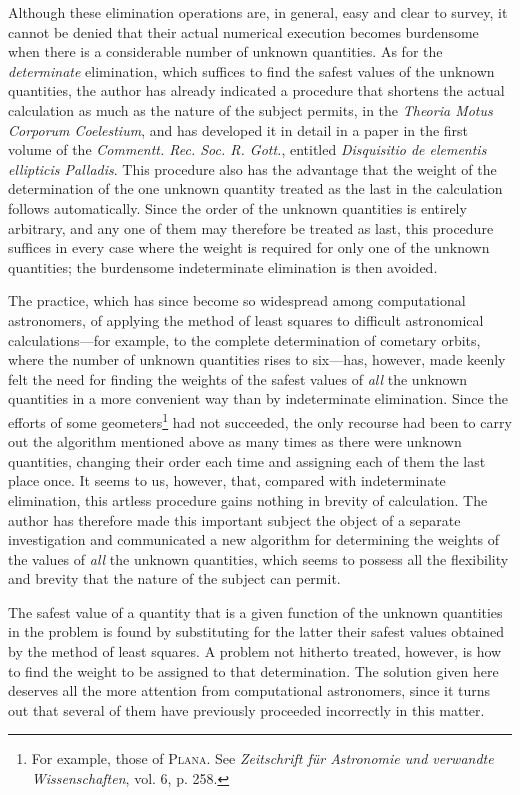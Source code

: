 Although these elimination operations are, in general, easy and clear to survey, it cannot be denied that their actual numerical execution becomes burdensome when there is a considerable number of unknown quantities. As for the \textit{determinate} elimination, which suffices to find the safest values of the unknown quantities, the author has already indicated a procedure that shortens the actual calculation as much as the nature of the subject permits, in the \textit{Theoria Motus Corporum Coelestium}, and has developed it in detail in a paper in the first volume of the \textit{Commentt. Rec. Soc. R. Gott.}, entitled \textit{Disquisitio de elementis ellipticis Palladis}. This procedure also has the advantage that the weight of the determination of the one unknown quantity treated as the last in the calculation follows automatically. Since the order of the unknown quantities is entirely arbitrary, and any one of them may therefore be treated as last, this procedure suffices in every case where the weight is required for only one of the unknown quantities; the burdensome indeterminate elimination is then avoided.

The practice, which has since become so widespread among computational astronomers, of applying the method of least squares to difficult astronomical calculations—for example, to the complete determination of cometary orbits, where the number of unknown quantities rises to six—has, however, made keenly felt the need for finding the weights of the safest values of \textit{all} the unknown quantities %
in a more convenient way than by indeterminate elimination.
Since the efforts of some geometers\footnote{For example, those of \textsc{Plana}. See \textit{Zeitschrift für Astronomie und verwandte Wissenschaften}, vol. 6, p. 258.} had not succeeded, the only recourse had been to carry out the algorithm mentioned above as many times as there were unknown quantities, changing their order each time and assigning each of them the last place once. It seems to us, however, that, compared with indeterminate elimination, this artless procedure gains nothing in brevity of calculation. The author has therefore made this important subject the object of a separate investigation and communicated a new algorithm for determining the weights of the values of \textit{all} the unknown quantities, which seems to possess all the flexibility and brevity that the nature of the subject can permit.

The safest value of a quantity that is a given function of the unknown quantities in the problem is found by substituting for the latter their safest values obtained by the method of least squares. A problem not hitherto treated, however, is how to find the weight to be assigned to that determination. The solution given here deserves all the more attention from computational astronomers, since it turns out that several of them have previously proceeded incorrectly in this matter.

